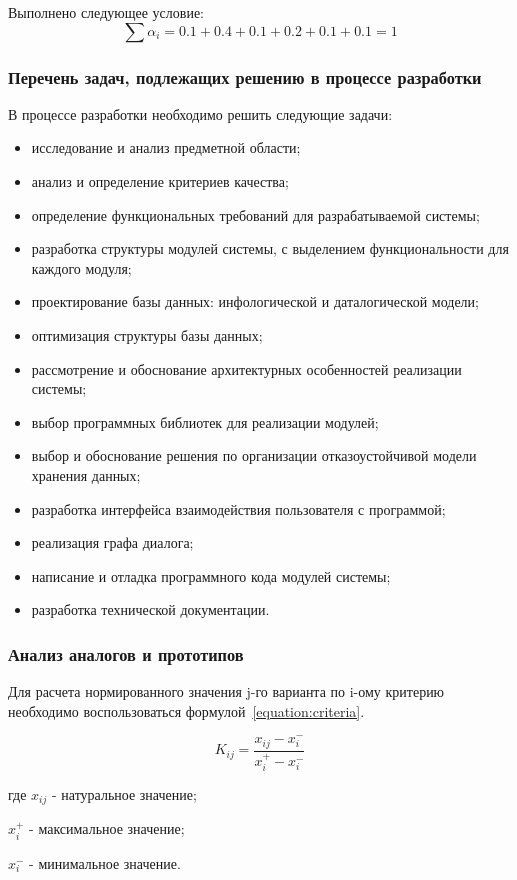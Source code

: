 Выполнено следующее условие:
\begin{equation}
\sum \alpha_i = 0.1 + 0.4 + 0.1 + 0.2 + 0.1 + 0.1 = 1
\end{equation}

\subsubsection{Перечень задач, подлежащих решению в процессе разработки}

В процессе разработки необходимо решить следующие задачи:
\begin{itemize}
\item исследование и анализ предметной области;
\item анализ и определение критериев качества;
\item определение функциональных требований для разрабатываемой системы;
\item разработка структуры модулей системы, с выделением функциональности для каждого модуля;
\item проектирование базы данных: инфологической и даталогической модели;
\item оптимизация структуры базы данных;
\item рассмотрение и обоснование архитектурных особенностей реализации системы;
\item выбор программных библиотек для реализации модулей;
\item выбор и обоснование решения по организации отказоустойчивой модели хранения данных;
\item разработка интерфейса взаимодействия пользователя с программой;
\item реализация графа диалога;
\item написание и отладка программного кода модулей системы;
\item разработка технической документации.
\end{itemize}

\subsubsection{Анализ аналогов и прототипов}

Для расчета нормированного значения j-го варианта по i-ому критерию необходимо
воспользоваться формулой~\ref{equation:criteria}.

\begin{equation}
\label{equation:criteria}
K_{ij} = \frac{x_{ij} - x_i^-}{x_i^+ - x_i^-}
\end{equation}
\begin{ESKDexplanation}
\item[где ] $x_{ij}$ - натуральное значение;
\item       $x_i^+$ - максимальное значение;
\item       $x_i^-$ - минимальное значение.
\end{ESKDexplanation}


